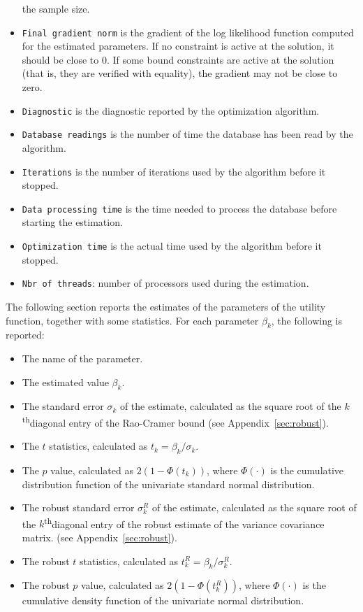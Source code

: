 \documentclass[12pt,a4paper]{article}
\renewcommand{\th}{\textsuperscript{th}}
\begin{document}
\begin{itemize}
         the sample size. 
      \item \lstinline+Final gradient norm+ is the gradient of the log
        likelihood function computed for the estimated parameters. If
        no constraint is active at the solution, it should be close to
        0. If  some bound
        constraints  are active at the
        solution (that is, they are verified with equality), the
        gradient may not be close to zero.
\item \lstinline+Diagnostic+ is the diagnostic reported by the optimization
algorithm. 
\item \lstinline+Database readings+ is the number of time the database
  has been read by the algorithm.
\item \lstinline+Iterations+ is the number of iterations used by the
  algorithm before it stopped.
 \item \lstinline+Data processing time+ is the time needed to process
   the database before starting the estimation. 
\item \lstinline+Optimization time+ is the actual time used by the algorithm before
it stopped.
\item \lstinline+Nbr of threads+: number of processors used during the estimation. 
   \end{itemize}


The following section reports the estimates of the parameters of the
utility function,
together with some statistics. For each parameter $\beta_k$, the following is reported:
   \begin{itemize}
  \item The name of the parameter.
      \item The estimated value $\beta_k$. 
      \item The standard error $\sigma_k$ of the estimate, calculated as the
         square root of the $k$\th diagonal entry of the
         Rao-Cramer bound (see Appendix~\ref{sec:robust}).
     \item The $t$ statistics, calculated as $t_k=\beta_k/\sigma_k$.
     \item The $p$ value, calculated as $2 (1 - \Phi(t_k))$,
where $\Phi(\cdot)$ is the cumulative distribution function of the
univariate standard normal distribution. 
      \item The robust standard error $\sigma^R_k$ of the estimate, calculated as the
         square root of the $k$\th diagonal entry of the
         robust estimate of the variance covariance matrix. (see Appendix~\ref{sec:robust}).
     \item The robust $t$ statistics, calculated as $t^R_k=\beta_k/\sigma^R_k$.
     \item The robust $p$ value, calculated as $2 (1 - \Phi(t^R_k))$,
where $\Phi(\cdot)$ is the cumulative density function of the
univariate normal distribution. 
   \end{itemize}
\end{document}
